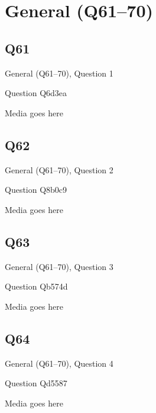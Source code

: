 \documentclass[11pt]{beamer}
\begin{document}
\section{General (Q61--70)}
    

\subsection*{Q61}
\begin{frame}[t]{General (Q61--70), Question 1}
\vspace{2em}
\begin{block}{Question}
Q6d3ea
\end{block}
\begin{center}
Media goes here
\end{center}
\end{frame}
    

\subsection*{Q62}
\begin{frame}[t]{General (Q61--70), Question 2}
\vspace{2em}
\begin{block}{Question}
Q8b0c9
\end{block}
\begin{center}
Media goes here
\end{center}
\end{frame}
    

\subsection*{Q63}
\begin{frame}[t]{General (Q61--70), Question 3}
\vspace{2em}
\begin{block}{Question}
Qb574d
\end{block}
\begin{center}
Media goes here
\end{center}
\end{frame}
    

\subsection*{Q64}
\begin{frame}[t]{General (Q61--70), Question 4}
\vspace{2em}
\begin{block}{Question}
Qd5587
\end{block}
\begin{center}
Media goes here
\end{center}
\end{frame}
    
\end{document}
